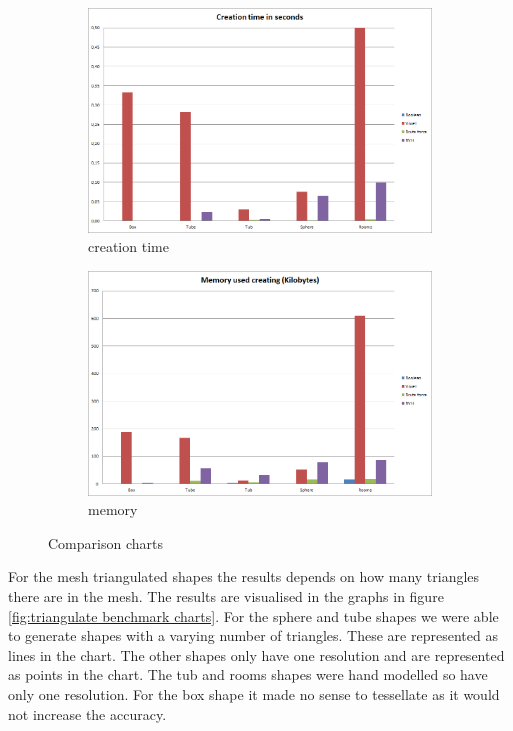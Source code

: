\documentclass[11pt,twoside,a4paper]{report}
\begin{document}
\begin{figure}[h]
\begin{subfigure}[h]{0.49\textwidth}
	\includegraphics[width=\textwidth]{images/chart_comparison_creation_time}
    \caption{creation time} \label{fig:comparison_creation_time} \end{subfigure}
	\begin{subfigure}[h]{0.49\textwidth}
	\includegraphics[width=\textwidth]{images/chart_comparison_creation_memory}
	\caption{memory} \label{fig:comparison_creation_memory} \end{subfigure}
    \caption{Comparison charts}\label{fig:comparison}
\end{figure}

For the mesh triangulated shapes the results depends on how many triangles there are in the mesh. The results are visualised in the graphs in figure \ref{fig:triangulate benchmark charts}. For the sphere and tube shapes we were able to generate shapes with a varying number of triangles. These are represented as lines in the chart. The other shapes only have one resolution and are represented as points in the chart. The tub and rooms shapes were hand modelled so have only one resolution. For the box shape it made no sense to tessellate as it would not increase the accuracy.
\end{document}
